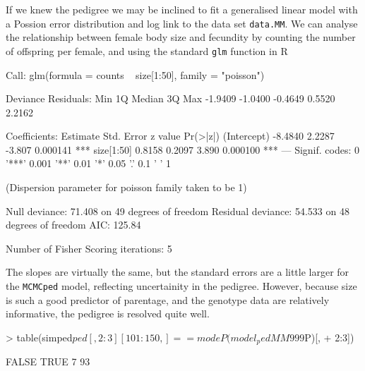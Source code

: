 \documentclass{article}
\begin{document}
 If we knew the pedigree we may be inclined to fit a generalised linear model with a Possion error distribution and log link to the data set \texttt{data.MM}.  We can analyse the relationship between female body size and fecundity by counting the number of offspring per female, and using the standard \texttt{glm} function in R 

\begin{Schunk}
\begin{Soutput}
Call:
glm(formula = counts ~ size[1:50], family = "poisson")

Deviance Residuals: 
    Min       1Q   Median       3Q      Max  
-1.9409  -1.0400  -0.4649   0.5520   2.2162  

Coefficients:
            Estimate Std. Error z value Pr(>|z|)    
(Intercept)  -8.4840     2.2287  -3.807 0.000141 ***
size[1:50]    0.8158     0.2097   3.890 0.000100 ***
---
Signif. codes:  0 '***' 0.001 '**' 0.01 '*' 0.05 '.' 0.1 ' ' 1 

(Dispersion parameter for poisson family taken to be 1)

    Null deviance: 71.408  on 49  degrees of freedom
Residual deviance: 54.533  on 48  degrees of freedom
AIC: 125.84

Number of Fisher Scoring iterations: 5
\end{Soutput}
\end{Schunk}

The slopes are virtually the same,  but the standard errors are a little larger for the \texttt{MCMCped} model, reflecting uncertainity in the pedigree.  However, because size is such a good predictor of parentage, and the genotype data are relatively informative, the pedigree is resolved quite well.

\begin{Schunk}
\begin{Sinput}
> table(simped$ped[, 2:3][101:150, ] == modeP(model_pedMM999$P)[, 
+     2:3])
\end{Sinput}
\begin{Soutput}
FALSE  TRUE 
    7    93 
\end{Soutput}
\end{Schunk}
\end{document}
